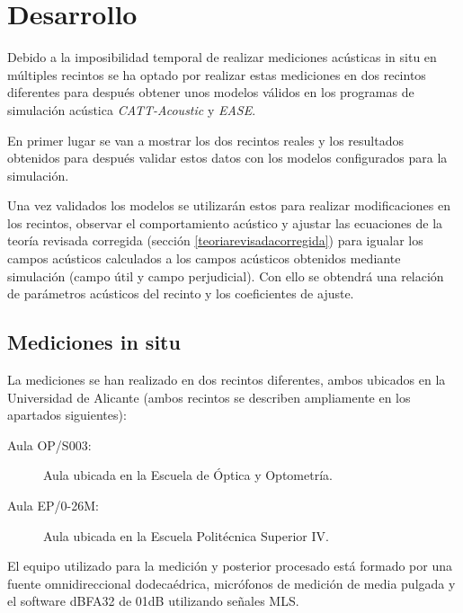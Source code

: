 
\chapter{Desarrollo}
\label{metodologia}


Debido a la imposibilidad temporal de realizar mediciones acústicas in situ en múltiples recintos se ha optado por realizar estas mediciones en dos recintos diferentes para después obtener unos modelos válidos en los programas de simulación acústica \textit{CATT-Acoustic} y \textit{EASE}.

En primer lugar se van a mostrar los dos recintos reales y los resultados obtenidos para después validar estos datos con los modelos configurados para la simulación.

Una vez validados los modelos se utilizarán estos para realizar modificaciones en los recintos, observar el comportamiento acústico y ajustar las ecuaciones de la teoría revisada corregida (sección \ref{teoriarevisadacorregida}) para igualar los campos acústicos calculados a los campos acústicos obtenidos mediante simulación (campo útil y campo perjudicial).
Con ello se obtendrá una relación de parámetros acústicos del recinto y los coeficientes de ajuste.


\section{Mediciones in situ}
\label{medicionesinsitu}
La mediciones se han realizado en dos recintos diferentes, ambos ubicados en la Universidad de Alicante (ambos recintos se describen ampliamente en los apartados siguientes):

\begin{description}
  \item[Aula OP/S003:] Aula ubicada en la Escuela de Óptica y Optometría.
  \item[Aula EP/0-26M:] Aula ubicada en la Escuela Politécnica Superior IV.
\end{description}




El equipo utilizado para la medición y posterior procesado está formado por una fuente omnidireccional dodecaédrica, micrófonos de medición de media pulgada y el software dBFA32 de 01dB utilizando señales MLS.

